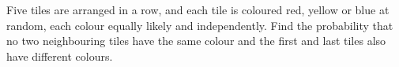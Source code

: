 Five tiles are arranged in a row, and each tile is coloured red, yellow or blue at random, each colour equally likely and independently. Find the probability that no two neighbouring tiles have the same colour and the first and last tiles also have different colours.
